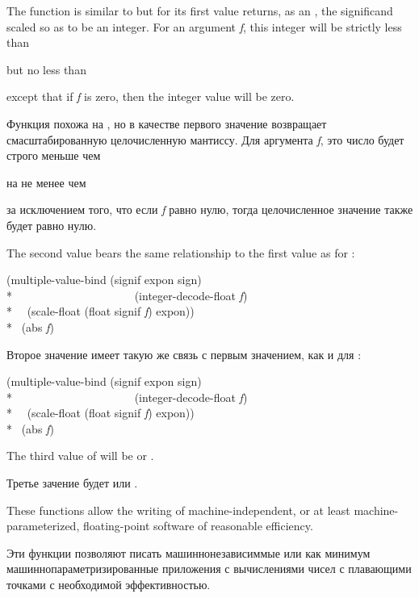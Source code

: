 \begin{defun}[Function]
The function  is similar to 
but for its first value returns,
as an , the significand scaled so as to be an integer.
For an argument \emph{f}, this integer will be strictly less than
\begin{lisp}
\end{lisp}
but no less than
\begin{lisp}
\end{lisp}
except that if \emph{f} is zero, then the integer value will be zero.

Функция  похожа на , но в качестве
первого значение возвращает смасштабированную целочисленную мантиссу.
Для аргумента \emph{f}, это число будет строго меньше чем
\begin{lisp}
\end{lisp}
на не менее чем 
\begin{lisp}
\end{lisp}
за исключением того, что если \emph{f} равно нулю, тогда целочисленное значение
также будет равно нулю.

The second value bears the same relationship to the first value
as for :
\begin{lisp}
(multiple-value-bind (signif expon sign) \\*
~~~~~~~~~~~~~~~~~~~~~(integer-decode-float \emph{f}) \\*
~~(scale-float (float signif \emph{f}) expon)) \\*
\EQ\ (abs \emph{f})
\end{lisp}

Второе значение имеет такую же связь с первым значением, как и для
: 
\begin{lisp}
(multiple-value-bind (signif expon sign) \\*
~~~~~~~~~~~~~~~~~~~~~(integer-decode-float \emph{f}) \\*
~~(scale-float (float signif \emph{f}) expon)) \\*
\EQ\ (abs \emph{f})
\end{lisp}

The third value of  will be  or .

Третье зачение  будет  или .

\beforenoterule
\begin{rationale}
These functions allow the writing of machine-independent,
or at least machine-parameterized, floating-point software of reasonable
efficiency.

Эти функции позволяют писать машиннонезависиммые или как минимум
машиннопараметризированные приложения с вычислениями чисел с плавающими точками
с необходимой эффективностью.
\end{rationale}
\afternoterule
\end{defun}

